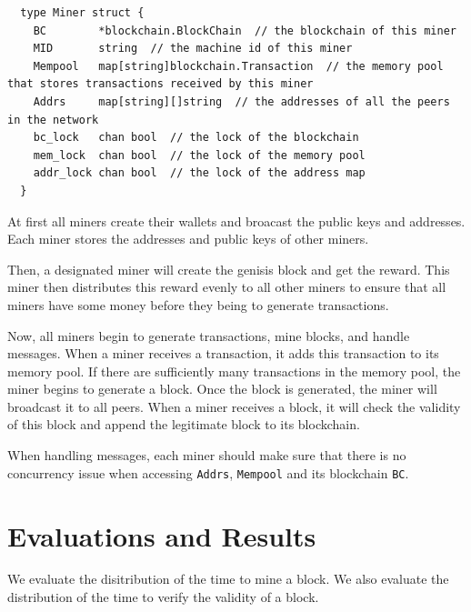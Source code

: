 \documentclass[10pt]{homework}
\begin{document}
\begin{lstlisting}
  type Miner struct {
    BC        *blockchain.BlockChain  // the blockchain of this miner
    MID       string  // the machine id of this miner
    Mempool   map[string]blockchain.Transaction  // the memory pool that stores transactions received by this miner
    Addrs     map[string][]string  // the addresses of all the peers in the network
    bc_lock   chan bool  // the lock of the blockchain
    mem_lock  chan bool  // the lock of the memory pool
    addr_lock chan bool  // the lock of the address map
  }
\end{lstlisting}

At first all miners create their wallets and broacast the public keys and addresses. Each miner stores the addresses and public keys of other miners. 

Then, a designated miner will create the genisis block and get the reward. This miner then distributes this reward evenly to all other miners to ensure that all miners have some money before they being to generate transactions.

Now, all miners begin to generate transactions, mine blocks, and handle messages. When a miner receives a transaction, it adds this transaction to its memory pool. If there are sufficiently many transactions in the memory pool, the miner begins to generate a block. Once the block is generated, the miner will broadcast it to all peers. When a miner receives a block, it will check the validity of this block and append the legitimate block to its blockchain.

When handling messages, each miner should make sure that there is no concurrency issue when accessing \texttt{Addrs}, \texttt{Mempool} and its blockchain \texttt{BC}.

\section{\textbf{Evaluations and Results}}

We evaluate the disitribution of the time to mine a block. We also evaluate the distribution of the time to verify the validity of a block. 
\end{document}
